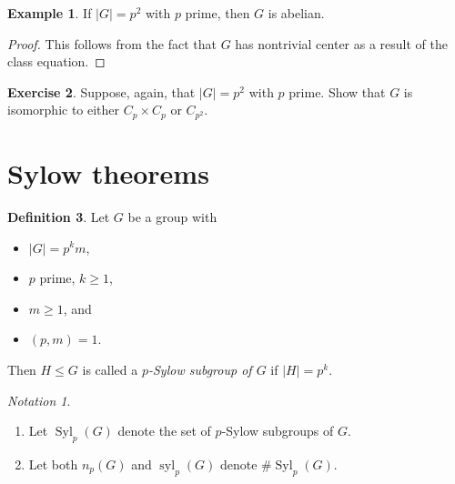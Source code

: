 \documentclass[10pt,letterpaper,cm]{nupset}
\theoremstyle{definition}
\newtheorem{definition}{Definition}[subsection]
\newtheorem{exmp}[definition]{Example}
\theoremstyle{theorem}
\newtheorem{exercise}[definition]{Exercise}
\theoremstyle{remark}
\newtheorem*{notation}{Notation}
\newcommand{\1}{\mathbf{1}}
\newcommand{\0}{\vec 0}
\DeclareMathOperator{\syl}{syl}
\DeclareMathOperator{\Syl}{Syl}
\begin{document}
\bigskip

\begin{exmp}
If $\lvert{G}\rvert =p^2$ with $p$ prime, then $G$ is abelian.
\end{exmp}
\begin{proof}
This follows from the fact that $G$ has nontrivial center as a result of the class equation.
\end{proof}

\begin{exercise}
Suppose, again, that $\lvert{G}\rvert =p^2$ with $p$ prime. Show that $G$  is isomorphic to either $C_p \times C_p$ or $C_{p^2}$.
\end{exercise}

\section{Sylow theorems}

\begin{definition}
Let $G$ be a group with 
\begin{itemize}
\item $\lvert{G}\rvert= p^km$,
\item  $p$ prime, $k\geq 1$, 
\item $m\geq 1$, and 
\item $\left(p,m\right) =1$. 
\end{itemize}
Then $H \leq G$ is called a \textit{$p$-Sylow subgroup of $G$} if $\lvert{H}\rvert = p^k$.
\end{definition}

\begin{notation} $ $
\begin{enumerate}
\item  Let $\Syl_p(G)$ denote the set of $p$-Sylow subgroups of $G$. 
\item  Let both $n_p(G)$ and $\syl_p(G)$ denote $\#{\Syl_p(G)}$. 
\end{enumerate}
\end{notation}

\smallskip
\end{document}
